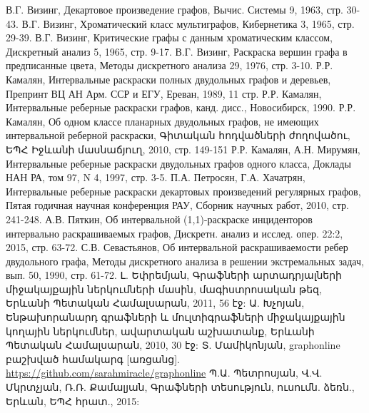  В.Г. Визинг, Декартовое произведение графов, Вычис. Системы 9, 1963, стр. 30-43. 
 В.Г. Визинг, Хроматический класс мультиграфов, Кибернетика 3, 1965, стр. 29-39.
 В.Г. Визинг, Критические графы с данным хроматическим классом, Дискретный анализ 5, 1965, стр. 9-17.
 В.Г. Визинг, Раскраска вершин графа в предписанные цвета, Методы дискретного анализа 29, 1976, стр. 3-10.
	Р.Р. Камалян, Интервальные раскраски полных двудольных графов и деревьев, Препринт ВЦ АН Арм. ССР и ЕГУ, Ереван, 1989, 11 стр. 
	Р.Р. Камалян, Интервальные реберные раскраски графов, канд. дисс., Новосибирск, 1990.
	Р.Р. Камалян, Об одном классе планарных двудольных графов, не имеющих интервальной реберной раскраски, Գիտական հոդվածների ժողովածու, ԵՊՀ Իջևանի մասնաճյուղ, 2010, стр. 149-151
	Р.Р. Камалян, А.Н. Мирумян, Интервальные реберные раскраски двудольных графов одного класса, Доклады НАН РА, том 97, N 4, 1997, стр. 3-5. 
 П.А. Петросян, Г.А. Хачатрян, Интервальные реберные раскраски декартовых произведений регулярных графов, Пятая годичная научная конференция РАУ, Сборник научных работ, 2010, стр. 241-248.
 А.В. Пяткин, Об интервальной (1,1)-раскраске инциденторов интервально раскрашиваемых графов, Дискретн. анализ и исслед. опер. 22:2, 2015, стр. 63-72.
 С.В. Севастьянов, Об интервальной раскрашиваемости ребер двудольного графа, Методы дискретного анализа в решении экстремальных задач, вып. 50, 1990, стр. 61-72.
	Լ. Եփրեմյան, Գրաֆների արտադրյալների միջակայքային ներկումների մասին, մագիստրոսական թեզ, Երևանի Պետական Համալսարան, 2011, 56 էջ:
 Ա. Խչոյան, Ենթախորանարդ գրաֆների և մուլտիգրաֆների միջակայքային կողային ներկումներ, ավարտական աշխատանք, Երևանի Պետական Համալսարան, 2010, 30 էջ:
 Տ. Մամիկոնյան, graphonline բաշխված համակարգ [առցանց]. \url{https://github.com/sarahmiracle/graphonline}
 Պ.Ա. Պետրոսյան, Վ.Վ. Մկրտչյան, Ռ.Ռ. Քամալյան, Գրաֆների տեսություն, ուսումն. ձեռն., Երևան, ԵՊՀ հրատ., 2015: